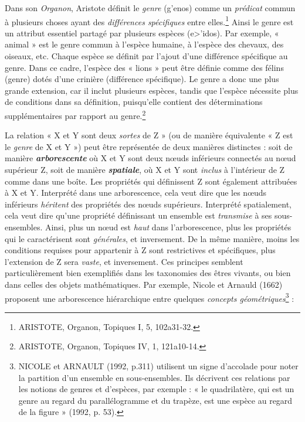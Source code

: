 \documentclass{article}
\newcommand{\bolditalic}[1]{\textbf{\textit{#1}}}
\begin{document}
Dans son \textit{Organon}, Aristote définit le \textit{genre} (\textgreek{g'enos}) comme un \textit{prédicat} commun à plusieurs choses ayant des \textit{différences spécifiques} entre elles.\footnote{ARISTOTE, Organon, Topiques I, 5, 102a31-32.} Ainsi le genre est un attribut essentiel partagé par plusieurs espèces (\textgreek{e>'idos}). Par exemple, « animal » est le genre commun à l’espèce humaine, à l’espèce des chevaux, des oiseaux, etc. Chaque espèce se définit par l’ajout d’une différence spécifique au genre. Dans ce cadre, l’espèce des « lions » peut être définie comme des félins (genre) dotés d’une crinière (différence spécifique). Le genre a donc une plus grande extension, car il inclut plusieurs espèces, tandis que l’espèce nécessite plus de conditions dans sa définition, puisqu’elle contient des déterminations supplémentaires par rapport au genre.\footnote{ARISTOTE, Organon, Topiques IV, 1, 121a10-14.}
\par
La relation « X et Y sont deux \textit{sortes} de Z » (ou de manière équivalente « Z est le \textit{genre} de X et Y ») peut être représentée de deux manières distinctes : soit de manière \bolditalic{arborescente} où X et Y sont deux nœuds inférieurs connectés au nœud supérieur Z, soit de manière \bolditalic{spatiale}, où X et Y sont \textit{inclus} à l’intérieur de Z comme dans une boîte. Les propriétés qui définissent Z sont également attribuées à X et Y. Interprété dans une arborescence, cela veut dire que les nœuds inférieurs \textit{héritent} des propriétés des nœuds supérieurs. Interprété spatialement, cela veut dire qu’une propriété définissant un ensemble est \textit{transmise} à ses sous-ensembles. Ainsi, plus un nœud est \textit{haut} dans l’arborescence, plus les propriétés qui le caractérisent sont \textit{générales}, et inversement. De la même manière, moins les conditions requises pour appartenir à Z sont restrictives et spécifiques, plus l’extension de Z sera \textit{vaste}, et inversement. Ces principes semblent particulièrement bien exemplifiés dans les taxonomies des êtres vivants, ou bien dans celles des objets mathématiques. Par exemple, Nicole et Arnauld (1662) proposent une arborescence hiérarchique entre quelques \textit{concepts géométriques}\footnote{NICOLE et ARNAULT (1992, p.311) utilisent un signe d'accolade pour noter la partition d'un ensemble en sous-ensembles. Ils décrivent ces relations par les notions de genres et d'espèces, par exemple : « le quadrilatère, qui est un genre au regard du parallélogramme et du trapèze, est une espèce au regard de la figure » (1992, p. 53).} :
\end{document}
